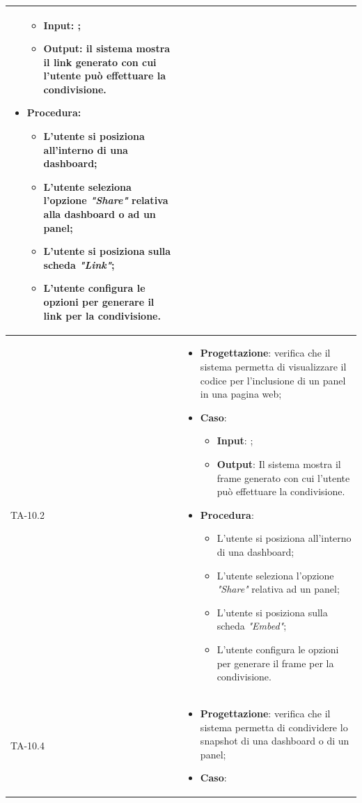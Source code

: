 \begin{longtable}{|C{2.5cm}|C{13cm}|}
\begin{itemize}
\begin{itemize}
		\item \textbf{Input}: ;
		\item \textbf{Output}: il sistema mostra il link generato con cui l'utente può effettuare la condivisione.
	\end{itemize}
	\item \textbf{Procedura}:
	\begin{itemize}
		\item L'utente si posiziona all'interno di una dashboard;
		\item L'utente seleziona l'opzione \emph{"Share"} relativa alla dashboard o ad un panel;
		\item L'utente si posiziona sulla scheda \emph{"Link"};
		\item L'utente configura le opzioni per generare il link per la condivisione.
	\end{itemize} 
\end{itemize}\\
\hline
{TA-10.2} &
\begin{itemize}
	\item \textbf{Progettazione}: verifica che il sistema permetta di visualizzare il codice per l'inclusione di un panel in una pagina web;
	\item \textbf{Caso}: 
	\begin{itemize}
		\item \textbf{Input}: ;
		\item \textbf{Output}: Il sistema mostra il frame generato con cui l'utente può effettuare la condivisione.
	\end{itemize}
	\item \textbf{Procedura}:
	\begin{itemize}
		\item L'utente si posiziona all'interno di una dashboard;
		\item L'utente seleziona l'opzione \emph{"Share"} relativa ad un panel;
		\item L'utente si posiziona sulla scheda \emph{"Embed"};
		\item L'utente configura le opzioni per generare il frame per la condivisione.
	\end{itemize} 
\end{itemize}\\
\hline
{TA-10.4} &
\begin{itemize}
	\item \textbf{Progettazione}: verifica che il sistema permetta di condividere lo snapshot di una dashboard o di un
	panel;
	\item \textbf{Caso}: 

\end{itemize}
\end{longtable}
